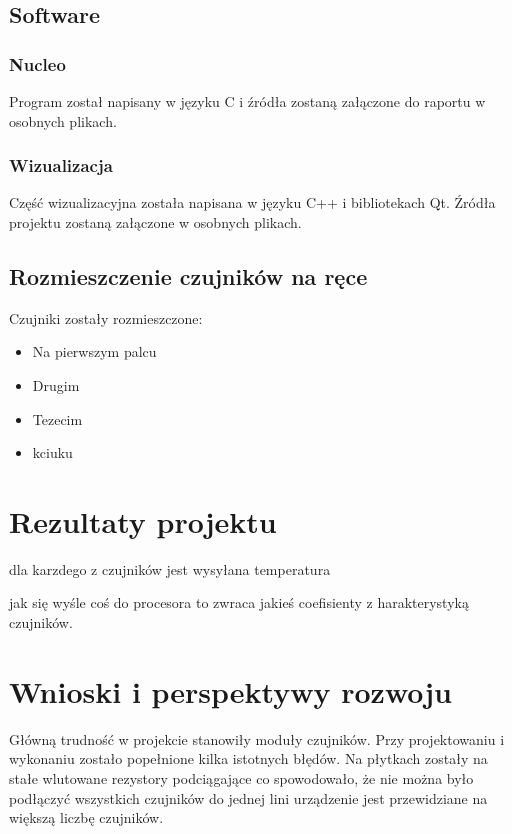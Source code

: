 \documentclass[a4paper,12pt]{article}
\begin{document}
		\subsection{Software}
			\subsubsection{Nucleo}
				Program został napisany w języku C i źródła zostaną załączone do raportu w osobnych plikach.
			\subsubsection{Wizualizacja}
				Część wizualizacyjna została napisana w języku C++ i bibliotekach Qt. Źródła projektu zostaną załączone w osobnych plikach.
		\subsection{Rozmieszczenie czujników na ręce}
		Czujniki zostały rozmieszczone:
		\begin{itemize}
			\item Na pierwszym palcu
			\item Drugim
			\item Tezecim
			\item kciuku
		\end{itemize}
		

	\section{Rezultaty projektu}	
	
	dla karzdego z czujników jest wysyłana temperatura
	
	jak się wyśle coś do procesora to zwraca jakieś coefisienty z harakterystyką czujników.	
			
	\section{Wnioski i perspektywy rozwoju}
		Główną trudność w projekcie stanowiły moduły czujników. Przy projektowaniu i wykonaniu zostało popełnione kilka istotnych błędów. Na płytkach zostały na stałe wlutowane rezystory podciągające co spowodowało, że nie można było podłączyć wszystkich czujników do jednej lini
	urządzenie jest przewidziane na większą liczbę czujników.
	
\end{document}

